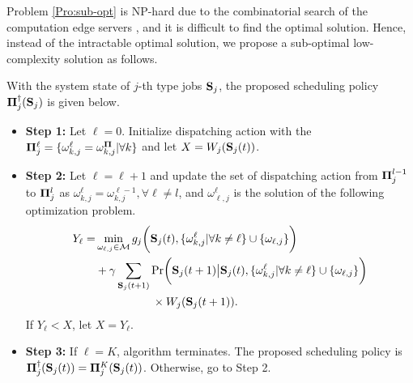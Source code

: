 Problem \ref{Pro:sub-opt} is NP-hard due to the combinatorial search of the computation edge servers \cite{dp-control}, and it is difficult to find the optimal solution. Hence, instead of the intractable optimal solution, we propose a sub-optimal low-complexity solution as follows.
\begin{Algorithm}
    \label{alg:proposed}
    With the system state of $j$-th type jobs $\mathbf{S}_{j}$, the proposed scheduling policy $\mathbf{\Pi}_j^{\dagger}(\mathbf{S}_{j})$ is given below.\em
    \begin{itemize}
        \item  {\bf Step 1: }Let $\ell=0$. Initialize dispatching action with the $\mathbf{\Pi}_j^{\ell}= \{\omega_{k,j}^{\ell}=\omega_{k,j}^{\mathbf{\Pi}}|\forall k\}$ and let $X=W_j(\mathbf{S}_j(t))$.
        \item {\bf Step 2: }Let $\ell=\ell+1$ and update the set of dispatching action from $\mathbf{\Pi}_{j}^{l-1}$ to $\mathbf{\Pi}_{j}^l$ as 
        $\omega_{k,j}^{\ell} = \omega_{k,j}^{\ell-1}, \forall \ell \neq l$, and $\omega_{\ell,j}^{\ell}$ is the solution of the following optimization problem. 
        \begin{align}	
        Y_{\ell} = &\min_{\omega_{\ell,j}\in\esSet}g_j\Paren{
            \Stat_j(t),\{\omega_{k,j}^{\ell}|\forall k\neq \ell\}\cup\{\omega_{\ell,j}\}
        }
        \nonumber\\
        &+\gamma \sum_{\Stat_j(t+1)} \Pr\Paren{
            \Stat_j(t+1)\big|\Stat_j(t),\{\omega_{k,j}^{\ell}|\forall k\neq \ell\}\cup\{\omega_{\ell,j}\}
        }\nonumber\\
        &\quad\quad\quad\quad\quad\times W_{j}(\Stat_j(t+1)).
        \end{align}
        If $Y_{\ell}<X$, let $X=Y_{\ell}$. 
        \item {\bf Step 3:} If $\ell=K$, algorithm terminates. The proposed scheduling policy is $\mathbf{\Pi}_{j}^{\dagger}(\mathbf{S}_j(t))=\mathbf{\Pi}_{j}^{K}(\mathbf{S}_j(t))$. Otherwise, go to Step 2.
    \end{itemize}
\end{Algorithm}

